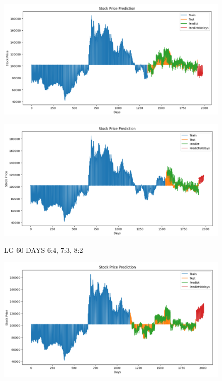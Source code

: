 \documentclass{article}
\begin{document}
\begin{multicols}{2}
\begin{figure}[H]
\begin{minipage}{0.15\textwidth}
    \label{fig:1}
    \end{minipage}%
    \begin{minipage}{0.15\textwidth}
    \centering
    \includegraphics[width=1\textwidth]{Image/N_Beat/N_BEAT_7_3_LG_60DAYS.png}
  
    \label{fig:2}
    \end{minipage}%
    \begin{minipage}{0.15\textwidth}
    \centering
    \includegraphics[width=1\textwidth]{Image/N_Beat/N_BEAT_8_2_LG_60DAYS.png}

    \label{fig:3}
    \end{minipage}
    \caption{LG 60 DAYS  6:4, 7:3, 8:2 }
\end{figure}



\begin{figure}[H]
    \centering
    \begin{minipage}{0.15\textwidth}
    \centering
    \includegraphics[width=1\textwidth]{Image/N_Beat/N_BEAT_6_4_LG_90DAYS.png}
   

\end{minipage}
\end{figure}
\end{multicols}
\end{document}
